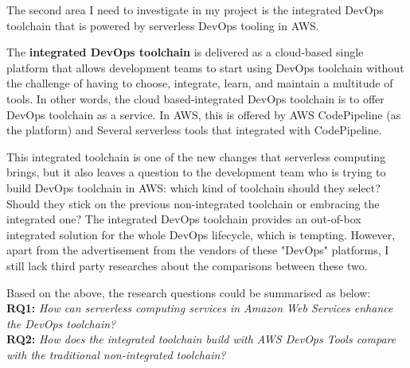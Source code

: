 \par
The second area I need to investigate in my project is the integrated DevOps toolchain that is powered by serverless DevOps tooling in AWS. 
\par
The \textbf{integrated DevOps toolchain} is delivered as a cloud-based single platform that allows development teams to start using DevOps toolchain without the challenge of having to choose, integrate, learn, and maintain a multitude of tools. In other words, the cloud based-integrated DevOps toolchain is to offer DevOps toolchain as a service.
In AWS, this is offered by AWS CodePipeline (as the platform) and Several serverless tools that integrated with CodePipeline.
\par
This integrated toolchain is one of the new changes that serverless computing brings, but it also leaves a question to the development team who is trying to build DevOps toolchain in AWS: which kind of toolchain should they select? Should they stick on the previous non-integrated toolchain or embracing the integrated one? The integrated DevOps toolchain provides an out-of-box integrated solution for the whole DevOps lifecycle, which is tempting. However, apart from the advertisement from the vendors of these "DevOps" platforms, I still lack third party researches about the comparisons between these two. 
\par
Based on the above, the research questions could be summarised as below: \\
\textbf{RQ1:} \textit{How can serverless computing services in Amazon Web Services enhance the DevOps toolchain?} \\
\textbf{RQ2:} \textit{How does the integrated toolchain build with AWS DevOps Tools compare with the traditional non-integrated toolchain?}
